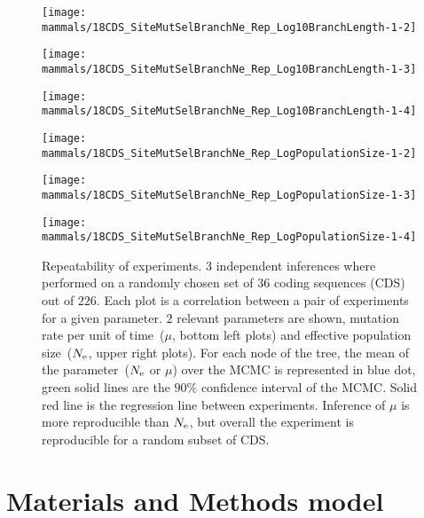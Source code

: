 \begin{figure}[H]
	\centering
	\begin{minipage}{0.32\linewidth}
		\texttt{[image: mammals/18CDS\_SiteMutSelBranchNe\_Rep\_Log10BranchLength-1-2]}
	\end{minipage}	\hfill
	\begin{minipage}{0.32\linewidth}
		\texttt{[image: mammals/18CDS\_SiteMutSelBranchNe\_Rep\_Log10BranchLength-1-3]}
	\end{minipage}	\hfill
	\begin{minipage}{0.32\linewidth}
		\texttt{[image: mammals/18CDS\_SiteMutSelBranchNe\_Rep\_Log10BranchLength-1-4]}
	\end{minipage}
	\begin{minipage}{0.32\linewidth}
		\texttt{[image: mammals/18CDS\_SiteMutSelBranchNe\_Rep\_LogPopulationSize-1-2]}
	\end{minipage}	\hfill
	\begin{minipage}{0.32\linewidth}
		\texttt{[image: mammals/18CDS\_SiteMutSelBranchNe\_Rep\_LogPopulationSize-1-3]}
	\end{minipage}	\hfill
	\begin{minipage}{0.32\linewidth}
		\texttt{[image: mammals/18CDS\_SiteMutSelBranchNe\_Rep\_LogPopulationSize-1-4]}
	\end{minipage}
	\caption[Repeatability of experiments]{
		Repeatability of experiments.
		$3$ independent inferences where performed on a randomly chosen set of $36$ coding sequences (CDS) out of $226$.
		Each plot is a correlation between a pair of experiments for a given parameter.
		$2$ relevant parameters are shown, mutation rate per unit of time~($\mu$, bottom left plots) and effective population size~($N_{\mathrm{e}}$, upper right plots).
		For each node of the tree, the mean of the parameter~($N_{\mathrm{e}}$ or $\mu$) over the \acrshort{MCMC} is represented in blue dot, green solid lines are the $90\%$ confidence interval of the \acrshort{MCMC}.
		Solid red line is the regression line between experiments.
		Inference of $\mu$ is more reproducible than $N_{\mathrm{e}}$, but overall the experiment is reproducible for a random subset of CDS.
	}
	\label{fig:mammals_repeatability}
\end{figure}

\section{Materials and Methods model}
\label{sec:MatMet}

